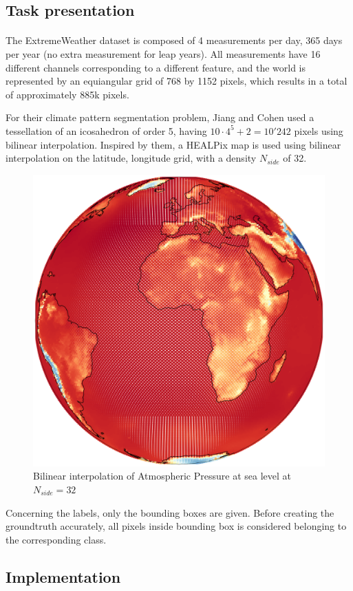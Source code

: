 \documentclass[11pt]{report}
\begin{document}
\subsection{Task presentation}
\paragraph*{}
The ExtremeWeather dataset \cite{racah_extremeweather:_2017} is composed of 4 measurements per day, 365 days per year (no extra measurement for leap years). All measurements have 16 different channels corresponding to a different feature, and the world is represented by an equiangular grid of 768 by 1152 pixels, which results in a total of approximately 885k pixels.

For their climate pattern segmentation problem, Jiang and Cohen used a tessellation of an icosahedron of order 5, having $10\cdot4^5+2 = 10'242$ pixels using bilinear interpolation. Inspired by them, a HEALPix map is used using bilinear interpolation on the latitude, longitude grid, with a density $N_{side}$ of 32.

\begin{figure}[!ht]
    \centering
    \includegraphics[width=0.6\linewidth]{world_nside32.png}
    \caption{Bilinear interpolation of Atmospheric Pressure at sea level at $N_{side}=32$}
    \label{fig:EW_nside32}
\end{figure}

Concerning the labels, only the bounding boxes are given. Before creating the groundtruth accurately, all pixels inside bounding box is considered belonging to the corresponding class.
\subsection{Implementation}
\end{document}
